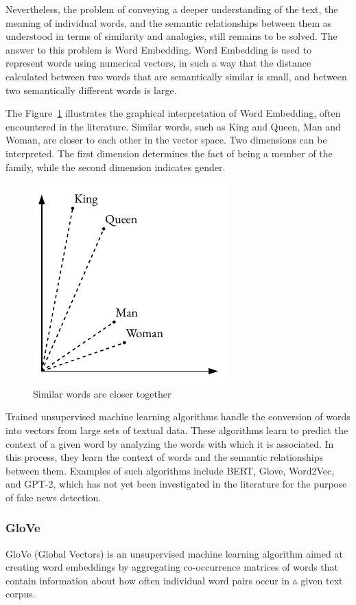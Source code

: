 Nevertheless, the problem of conveying a deeper understanding of the text, the meaning of individual words, and the semantic relationships between them as understood in terms of similarity and analogies, still remains to be solved. The answer to this problem is Word Embedding. Word Embedding is used to represent words using numerical vectors, in such a way that the distance calculated between two words that are semantically similar is small, and between two semantically different words is large.

The Figure~\ref{embedding_example} illustrates the graphical interpretation of Word Embedding, often encountered in the literature. Similar words, such as King and Queen, Man and Woman, are closer to each other in the vector space. Two dimensions can be interpreted. The first dimension determines the fact of being a member of the family, while the second dimension indicates gender.

\begin{figure}[hbt!]
\centering
\includegraphics[width=0.55\linewidth]{embedding_example.pdf}
\caption{Similar words are closer together}
\label{embedding_example}
\end{figure}

Trained unsupervised machine learning algorithms handle the conversion of words into vectors from large sets of textual data. These algorithms learn to predict the context of a given word by analyzing the words with which it is associated. In this process, they learn the context of words and the semantic relationships between them. Examples of such algorithms include BERT, Glove, Word2Vec, and GPT-2, which has not yet been investigated in the literature for the purpose of fake news detection.

\subsubsection{GloVe}
GloVe (Global Vectors) is an unsupervised machine learning algorithm aimed at creating word embeddings by aggregating co-occurrence matrices of words that contain information about how often individual word pairs occur in a given text corpus.

